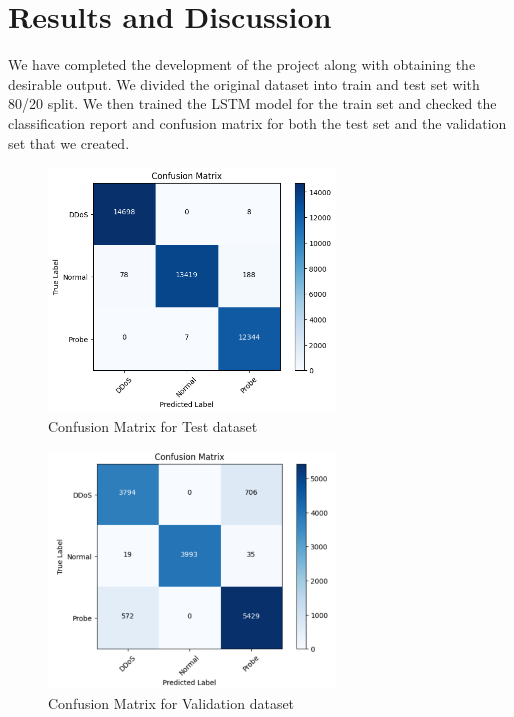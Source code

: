 \chapter{Results and Discussion}
\vspace{-18pt}
We have completed the development of the project along with obtaining the desirable output. We divided the original dataset into train and test set with 80/20 split. We then trained the LSTM model for the train set and checked the classification report and confusion matrix for both the test set and the validation set that we created.\par
\begin{figure}[tbh] %
	\begin{center}
		\includegraphics[width=3in]{images/confMatTest.png} 
		\caption{Confusion Matrix for Test dataset} %
		\label{Confusion Matrix for Test dataset} 
	\end{center}
\end{figure}
\begin{figure}[tbh] %
	\begin{center}
		\includegraphics[width=3in]{images/confMatVal.png} 
		\caption{Confusion Matrix for Validation dataset} %
		\label{Confusion Matrix for Validation dataset} 
	\end{center}
\end{figure}
